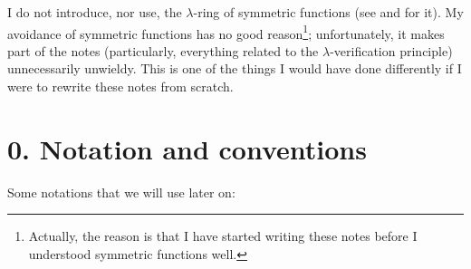 \documentclass[numbers=enddot,12pt,final,onecolumn,notitlepage]{scrartcl}%
\begin{document}
I do not introduce, nor use, the $\lambda$-ring of symmetric functions (see
\cite{Knut73} and \cite[\S 9, \S 16]{Hazewi08b} for it). My avoidance of
symmetric functions has no good reason\footnote{Actually, the reason is that I
have started writing these notes before I understood symmetric functions
well.}; unfortunately, it makes part of the notes (particularly, everything
related to the $\lambda$-verification principle) unnecessarily unwieldy. This
is one of the things I would have done differently if I were to rewrite these
notes from scratch.

\section*{0. Notation and conventions}

Some notations that we will use later on:
\end{document}
